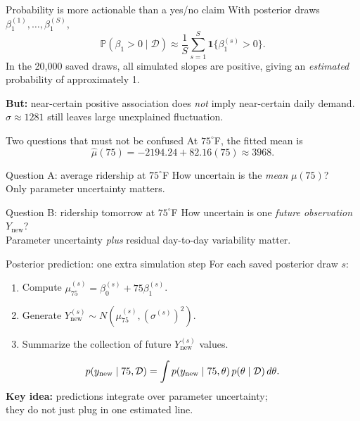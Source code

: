 \documentclass[aspectratio=43,11pt]{beamer}
\newcommand{\Prob}{\mathbb{P}}
\newcommand{\dd}{\mathcal D}
\begin{document}
\begin{frame}{Probability is more actionable than a yes/no claim}
With posterior draws $\beta_1^{(1)},\ldots,\beta_1^{(S)}$,
\[\Prob(\beta_1>0\mid\dd)\approx\frac1S\sum_{s=1}^{S}\mathbf 1\{\beta_1^{(s)}>0\}.\]
In the 20,000 saved draws, all simulated slopes are positive, giving an \emph{estimated} probability of approximately 1.
\par\medskip\textbf{But:} near-certain positive association does \emph{not} imply near-certain daily demand. $\sigma\approx1281$ still leaves large unexplained fluctuation.
\end{frame}

\begin{frame}{Two questions that must not be confused}
At $75^\circ$F, the fitted mean is
\[\widehat\mu(75)=-2194.24+82.16(75)\approx3968.\]
\begin{block}{Question A: average ridership at $75^\circ$F}
How uncertain is the \emph{mean} $\mu(75)$?\\
Only parameter uncertainty matters.
\end{block}
\begin{block}{Question B: ridership tomorrow at $75^\circ$F}
How uncertain is one \emph{future observation} $Y_{\mathrm{new}}$?\\
Parameter uncertainty \emph{plus} residual day-to-day variability matter.
\end{block}
\end{frame}

\begin{frame}{Posterior prediction: one extra simulation step}
For each saved posterior draw $s$:
\begin{enumerate}
\item Compute $\mu_{75}^{(s)}=\beta_0^{(s)}+75\beta_1^{(s)}$.
\item Generate $Y_{\mathrm{new}}^{(s)}\sim N(\mu_{75}^{(s)},(\sigma^{(s)})^2)$.
\item Summarize the collection of future $Y_{\mathrm{new}}^{(s)}$ values.
\end{enumerate}
\[p(y_{\rm new}\mid75,\dd)=\int p(y_{\rm new}\mid75,\theta)\,p(\theta\mid\dd)\,d\theta.\]
\textbf{Key idea:} predictions integrate over parameter uncertainty;\\
they do not just plug in one estimated line.
\end{frame}
\end{document}

